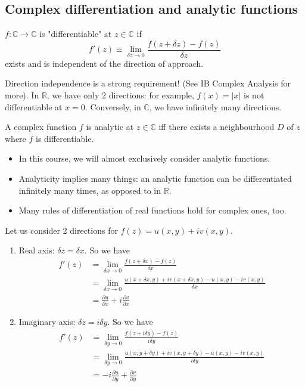 \documentclass[a4paper]{scrartcl}
\begin{document}
\subsection{Complex differentiation and analytic functions}
\begin{definition*}
      $f: \mathbb{C} \rightarrow \mathbb{C}$ is "differentiable" at $z \in \mathbb{C}$ if \[
      f' (z) \equiv \lim_{\delta z \rightarrow 0} \frac{f (z+ \delta z)-f (z)}{\delta z}
      \] exists and is independent of the direction of approach.
\end{definition*}
\begin{remark}
      Direction independence is a strong requirement! (See IB Complex Analysis for more). In $\mathbb{R}$, we have only 2 directions: for example, $f (x)=|x|$ is not differentiable at $x=0$. Conversely, in $\mathbb{C}$, we have infinitely many directions. 
\end{remark}
\begin{definition*}[Analyticity]
      A complex function $f$ is analytic at $z \in \mathbb{C}$ iff there exists a neighbourhood $D$ of $z$ where $f$ is differentiable.
\end{definition*}
\begin{remark}
      \begin{itemize}
           \item In this course, we will almost exclusively consider analytic functions.
           \item Analyticity implies many things: an analytic function can be differentiated infinitely many times, as opposed to in $\mathbb{R}$.
           \item Many rules of differentiation of real functions hold for complex ones, too. 
      \end{itemize}
\end{remark}
Let us consider 2 directions for $f (z)=u (x,y)+iv (x,y)$. 
\begin{enumerate}
     \item Real axis: $\delta z= \delta x$. So we have 
     \begin{align*}
          f' (z)&= \lim_{\delta x \rightarrow 0} \frac{f (z+\delta x)-f (z)}{\delta x}\\
          &=\lim_{\delta x \rightarrow 0} \frac{u (x+\delta x,y)+iv (x+\delta x,y)-u (x,y)-iv (x,y)}{\delta x}\\
          &=\frac{\partial u}{\partial x}+i \frac{\partial v}{\partial x}
     \end{align*}
     \item Imaginary axis: $\delta z= i \delta y$. So we have 
     \begin{align*}
          f' (z)&= \lim_{\delta y \rightarrow 0} \frac{f (z+i\delta y)-f (z)}{i \delta y}\\
          &=\lim_{\delta y \rightarrow 0} \frac{u (x,y+\delta y)+iv (x,y+ \delta y)-u (x,y)-iv (x,y)}{i \delta y}\\
          &=-i\frac{\partial u}{\partial y}+\frac{\partial v}{\partial y}
     \end{align*}
\end{enumerate}
\end{document}
